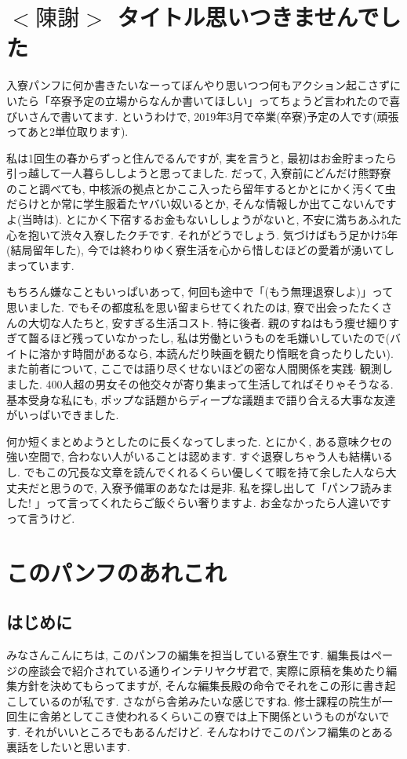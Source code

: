 \documentclass[10pt,b5jsbook,dvips,dvipdfmx,openany]{jsbook}
\theoremstyle{definition}
\begin{document}

	\section{$<陳謝>$ タイトル思いつきませんでした} %
	入寮パンフに何か書きたいなーってぼんやり思いつつ何もアクション起こさずにいたら「卒寮予定の立場からなんか書いてほしい」ってちょうど言われたので喜びいさんで書いてます. というわけで, 2019年3月で卒業(卒寮)予定の人です(頑張ってあと2単位取ります).

	私は1回生の春からずっと住んでるんですが, 実を言うと, 最初はお金貯まったら引っ越して一人暮らししようと思ってました. だって, 入寮前にどんだけ熊野寮のこと調べても, 中核派の拠点とかここ入ったら留年するとかとにかく汚くて虫だらけとか常に学生服着たヤバい奴いるとか, そんな情報しか出てこないんですよ(当時は). とにかく下宿するお金もないししょうがないと, 不安に満ちあふれた心を抱いて渋々入寮したクチです. それがどうでしょう. 気づけばもう足かけ5年(結局留年した), 今では終わりゆく寮生活を心から惜しむほどの愛着が湧いてしまっています.

	もちろん嫌なこともいっぱいあって, 何回も途中で「(もう無理退寮しよ)」って思いました. でもその都度私を思い留まらせてくれたのは, 寮で出会ったたくさんの大切な人たちと, 安すぎる生活コスト. 特に後者. 親のすねはもう痩せ細りすぎて齧るほど残っていなかったし, 私は労働というものを毛嫌いしていたので(バイトに溶かす時間があるなら, 本読んだり映画を観たり惰眠を貪ったりしたい). また前者について, ここでは語り尽くせないほどの密な人間関係を実践$ \cdot $ 観測しました. 400人超の男女その他交々が寄り集まって生活してればそりゃそうなる. 基本受身な私にも, ポップな話題からディープな議題まで語り合える大事な友達がいっぱいできました.

	何か短くまとめようとしたのに長くなってしまった. とにかく, ある意味クセの強い空間で, 合わない人がいることは認めます. すぐ退寮しちゃう人も結構いるし. でもこの冗長な文章を読んでくれるくらい優しくて暇を持て余した人なら大丈夫だと思うので, 入寮予備軍のあなたは是非. 私を探し出して「パンフ読みました! 」って言ってくれたらご飯ぐらい奢りますよ. お金なかったら人違いですって言うけど.



	\section{このパンフのあれこれ}

      \subsection{はじめに}
	     みなさんこんにちは, このパンフの編集を担当している寮生です. 編集長は\pageref{page:座談会}ページの座談会で紹介されている通りインテリヤクザ君で, 実際に原稿を集めたり編集方針を決めてもらってますが, そんな編集長殿の命令でそれをこの形に書き起こしているのが私です. さながら舎弟みたいな感じですね.  修士課程の院生が一回生に舎弟としてこき使われるくらいこの寮では上下関係というものがないです. それがいいところでもあるんだけど.  そんなわけでこのパンフ編集のとある裏話をしたいと思います.
\end{document}
